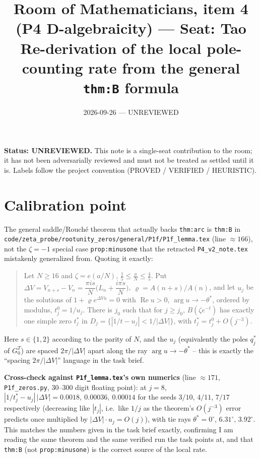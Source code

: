 \documentclass[11pt]{article}
\title{Room of Mathematicians, item 4 (P4 D-algebraicity) --- Seat: Tao\\
Re-derivation of the local pole-counting rate from the general \texttt{thm:B} formula}
\date{2026-09-26 --- UNREVIEWED}
\theoremstyle{remark}
\begin{document}
\maketitle

\noindent\textbf{Status: UNREVIEWED.} This note is a single-seat contribution to the room; it has
not been adversarially reviewed and must not be treated as settled until it is. Labels follow the
project convention (PROVED / VERIFIED / HEURISTIC).

\section{Calibration point}

The general saddle/Rouch\'e theorem that actually backs \texttt{thm:arc} is
\texttt{thm:B} in \texttt{code/zeta\_probe/rootunity\_zeros/general/P1f/P1f\_lemma.tex}
(line $\approx166$), not the $\zeta=-1$ special case \texttt{prop:minusone} that the retracted
\texttt{P4\_v2\_note.tex} mistakenly generalized from. Quoting it exactly:

\begin{quote}
Let $N\ge16$ and $\zeta=e(a/N)$, $\frac15\le\frac aN\le\frac45$. Put
$\Delta V = V_{n+s}-V_n=\dfrac{\pi i s}{N}\Big(L_n+\dfrac{i\pi s}{N}\Big)$,
$\varrho=A(n+s)/A(n)$, and let $u_j$ be the solutions of $1+\varrho e^{\Delta V u}=0$ with
$\operatorname{Re}u>0$, $\arg u\to-\theta^*$, ordered by modulus, $t^0_j=1/u_j$. There is $j_0$
such that for $j\ge j_0$, $B(\zeta e^{-t})$ has exactly one simple zero $t^*_j$ in
$D_j=\{|1/t-u_j|<1/|\Delta V|\}$, with $t^*_j=t^0_j+O(j^{-3})$.
\end{quote}

Here $s\in\{1,2\}$ according to the parity of $N$, and the $u_j$ (equivalently the poles $q^*_j$
of $G^T_0$) are spaced $2\pi/|\Delta V|$ apart along the ray $\arg u\to-\theta^*$ -- this is exactly
the ``spacing $2\pi/|\Delta V|$'' language in the task brief.

\textbf{Cross-check against \texttt{P1f\_lemma.tex}'s own numerics} (line $\approx171$,
\texttt{P1f\_zeros.py}, 30--300 digit floating point): at $j=8$, $|1/t^*_j-u_j|\,|\Delta V|=
0.0018,\ 0.00036,\ 0.00014$ for the seeds $3/10$, $4/11$, $7/17$ respectively (decreasing like
$|t_j|$, i.e.\ like $1/j$ as the theorem's $O(j^{-3})$ error predicts once multiplied by
$|\Delta V|\cdot u_j=O(j)$), with tie rays $\theta^*=0^\circ,\,6.31^\circ,\,3.92^\circ$. This matches
the numbers given in the task brief exactly, confirming I am reading the same theorem and the same
verified run the task points at, and that \texttt{thm:B} (not \texttt{prop:minusone}) is the
correct source of the local rate.
\end{document}
